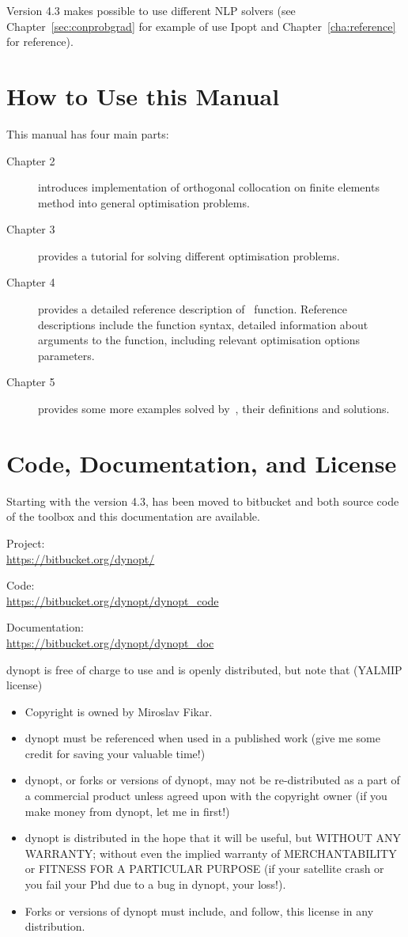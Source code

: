 Version 4.3 makes possible to use different NLP solvers (see
Chapter~\ref{sec:conprobgrad} for example of use Ipopt and
Chapter~\ref{cha:reference} for reference).

\section{How to Use this Manual}
\label{sec:howtouseman}

This manual has four main parts:
\begin{description}
\item[Chapter 2] introduces implementation of orthogonal collocation
  on finite elements method into general optimisation problems.
\item[Chapter 3] provides a tutorial for solving different
  optimisation problems.
\item[Chapter 4] provides a detailed reference description
  of~ function. Reference descriptions include the
  function syntax, detailed information about arguments to the
  function, including relevant optimisation options parameters.
\item[Chapter 5] provides some more examples solved by~,
  their definitions and solutions.
\end{description}

\section{Code, Documentation, and License}
Starting with the version 4.3,  has been moved to
bitbucket and both source code of the toolbox and this documentation
are available. 

Project: \\
\url{https://bitbucket.org/dynopt/}

Code:\\
\url{https://bitbucket.org/dynopt/dynopt_code}

Documentation:\\
\url{https://bitbucket.org/dynopt/dynopt_doc}

\medskip
\noindent
dynopt is free of charge to use and is openly distributed, but note
that (YALMIP license)
\begin{itemize}
\item Copyright is owned by Miroslav Fikar.
\item dynopt must be referenced when used in a published work (give me
  some credit for saving your valuable time!)
\item dynopt, or forks or versions of dynopt, may not be
  re-distributed as a part of a commercial product unless agreed upon
  with the copyright owner (if you make money from dynopt, let me in
  first!)
\item dynopt is distributed in the hope that it will be useful, but
  WITHOUT ANY WARRANTY; without even the implied warranty of
  MERCHANTABILITY or FITNESS FOR A PARTICULAR PURPOSE (if your
  satellite crash or you fail your Phd due to a bug in dynopt, your
  loss!).
\item Forks or versions of dynopt must include, and follow, this
  license in any distribution.
\end{itemize}
 
